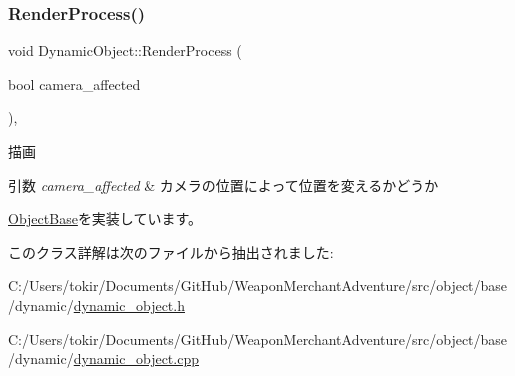 \subsubsection{\texorpdfstring{Render\+Process()}{RenderProcess()}}
{\footnotesize\ttfamily void Dynamic\+Object\+::\+Render\+Process (\begin{DoxyParamCaption}\item[{bool}]{camera\+\_\+affected }\end{DoxyParamCaption})\hspace{0.3cm}{\ttfamily [protected]}, {\ttfamily [virtual]}}



描画 


\begin{DoxyParams}{引数}
{\em camera\+\_\+affected} & カメラの位置によって位置を変えるかどうか \\
\hline
\end{DoxyParams}


\mbox{\hyperlink{class_object_base_aeac51d868beeb7f7fe900407b76b93a2}{Object\+Base}}を実装しています。



このクラス詳解は次のファイルから抽出されました\+:\begin{DoxyCompactItemize}
\item 
C\+:/\+Users/tokir/\+Documents/\+Git\+Hub/\+Weapon\+Merchant\+Adventure/src/object/base/dynamic/\mbox{\hyperlink{dynamic__object_8h}{dynamic\+\_\+object.\+h}}\item 
C\+:/\+Users/tokir/\+Documents/\+Git\+Hub/\+Weapon\+Merchant\+Adventure/src/object/base/dynamic/\mbox{\hyperlink{dynamic__object_8cpp}{dynamic\+\_\+object.\+cpp}}\end{DoxyCompactItemize}
